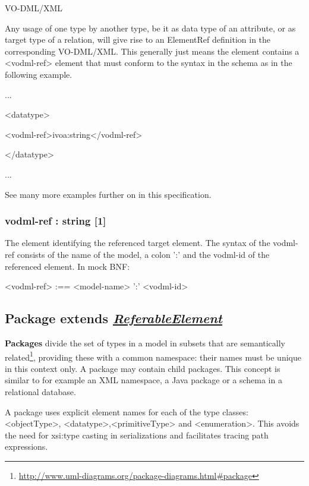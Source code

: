 \documentclass[10pt,a4paper]{ivoa}
\begin{document}
VO-DML/XML

Any usage of one type by another type, be it as data type of an
attribute, or as target type of a relation, will give rise to an
ElementRef definition in the corresponding VO-DML/XML. This generally
just means the element contains a \textless vodml-ref\textgreater{}
element that must conform to the syntax in the schema as in the
following example.

...

\textless datatype\textgreater{}

\textless vodml-ref\textgreater ivoa:string\textless/vodml-ref\textgreater{}

\textless/datatype\textgreater{}

...

See many more examples further on in this specification.

\hypertarget{vodml-ref-string-1}{%
\subsubsection{vodml-ref : string {[}1{]}}\label{vodml-ref-string-1}}

The element identifying the referenced target element. The syntax of the
vodml-ref consists of the name of the model, a colon ':' and the
vodml-id of the referenced element. In mock BNF:

\textless vodml-ref\textgreater{} :== \textless model-name\textgreater{}
':' \textless vodml-id\textgreater{}

\hypertarget{package-extends-referableelement}{%
\subsection{\texorpdfstring{Package extends
\protect\hyperlink{referableelement}{\emph{ReferableElement}}}{Package extends ReferableElement}}\label{package-extends-referableelement}}

\textbf{Packages} divide the set of types in a model in subsets that are
semantically related\footnote{\url{http://www.uml-diagrams.org/package-diagrams.html\#package}},
providing these with a common namespace: their names must be unique in
this context only. A package may contain child packages. This concept is
similar to for example an XML namespace, a Java package or a schema in a
relational database.

A package uses explicit element names for each of the type classes:
\textless objectType\textgreater,
\textless datatype\textgreater,\textless primitiveType\textgreater{} and
\textless enumeration\textgreater. This avoids the need for xsi:type
casting in serializations and facilitates tracing path expressions.
\end{document}
